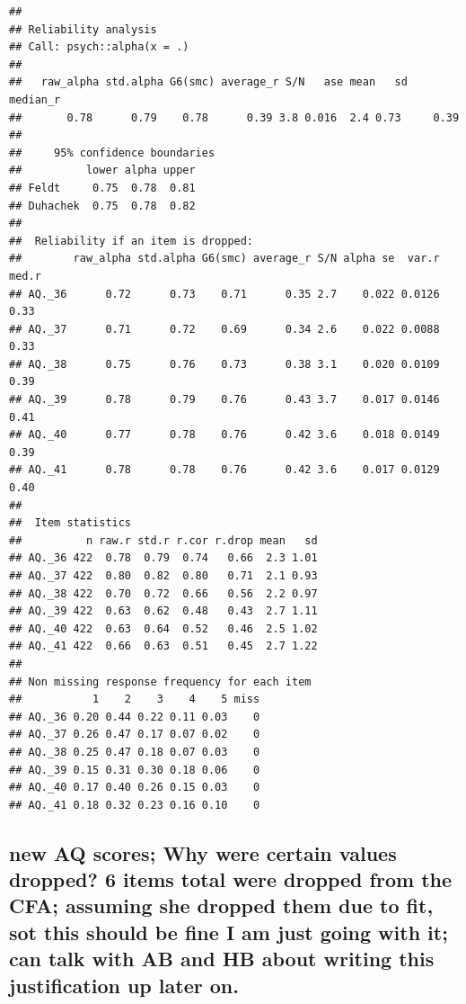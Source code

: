 \documentclass[
]{article}
\begin{document}
\begin{verbatim}
## 
## Reliability analysis   
## Call: psych::alpha(x = .)
## 
##   raw_alpha std.alpha G6(smc) average_r S/N   ase mean   sd median_r
##       0.78      0.79    0.78      0.39 3.8 0.016  2.4 0.73     0.39
## 
##     95% confidence boundaries 
##          lower alpha upper
## Feldt     0.75  0.78  0.81
## Duhachek  0.75  0.78  0.82
## 
##  Reliability if an item is dropped:
##        raw_alpha std.alpha G6(smc) average_r S/N alpha se  var.r med.r
## AQ._36      0.72      0.73    0.71      0.35 2.7    0.022 0.0126  0.33
## AQ._37      0.71      0.72    0.69      0.34 2.6    0.022 0.0088  0.33
## AQ._38      0.75      0.76    0.73      0.38 3.1    0.020 0.0109  0.39
## AQ._39      0.78      0.79    0.76      0.43 3.7    0.017 0.0146  0.41
## AQ._40      0.77      0.78    0.76      0.42 3.6    0.018 0.0149  0.39
## AQ._41      0.78      0.78    0.76      0.42 3.6    0.017 0.0129  0.40
## 
##  Item statistics 
##          n raw.r std.r r.cor r.drop mean   sd
## AQ._36 422  0.78  0.79  0.74   0.66  2.3 1.01
## AQ._37 422  0.80  0.82  0.80   0.71  2.1 0.93
## AQ._38 422  0.70  0.72  0.66   0.56  2.2 0.97
## AQ._39 422  0.63  0.62  0.48   0.43  2.7 1.11
## AQ._40 422  0.63  0.64  0.52   0.46  2.5 1.02
## AQ._41 422  0.66  0.63  0.51   0.45  2.7 1.22
## 
## Non missing response frequency for each item
##           1    2    3    4    5 miss
## AQ._36 0.20 0.44 0.22 0.11 0.03    0
## AQ._37 0.26 0.47 0.17 0.07 0.02    0
## AQ._38 0.25 0.47 0.18 0.07 0.03    0
## AQ._39 0.15 0.31 0.30 0.18 0.06    0
## AQ._40 0.17 0.40 0.26 0.15 0.03    0
## AQ._41 0.18 0.32 0.23 0.16 0.10    0
\end{verbatim}

\subsection{new AQ scores; Why were certain values dropped? 6 items
total were dropped from the CFA; assuming she dropped them due to fit,
sot this should be fine I am just going with it; can talk with AB and HB
about writing this justification up later
on.}\label{new-aq-scores-why-were-certain-values-dropped-6-items-total-were-dropped-from-the-cfa-assuming-she-dropped-them-due-to-fit-sot-this-should-be-fine-i-am-just-going-with-it-can-talk-with-ab-and-hb-about-writing-this-justification-up-later-on.}
\end{document}
